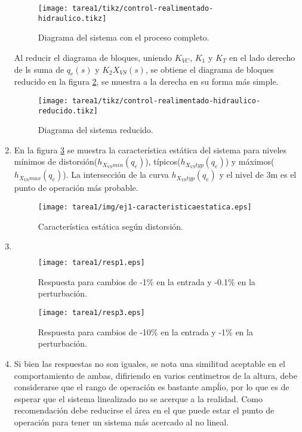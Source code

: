 \begin{ejercicio}
\begin{enumerate}
    \begin{figure}[H]
      \centering
      \texttt{[image: tarea1/tikz/control-realimentado-hidraulico.tikz]}
      \caption{Diagrama del sistema con el proceso completo.}
      \label{ej1:diag1}
    \end{figure}

    Al reducir el diagrama de bloques, uniendo $K_{VC}$, $K_1$ y $K_T$ en el lado derecho de ls suma de $q_e(s)$ y $K_2 X_{VS}(s)$, se obtiene el diagrama de bloques reducido en la figura \ref{ej1:diag2}, se muestra a la derecha en su forma más simple.  

   \begin{figure}[H]
    \centering
      \texttt{[image: tarea1/tikz/control-realimentado-hidraulico-reducido.tikz]}
      \caption{Diagrama del sistema reducido.}
      \label{ej1:diag2}
    \end{figure}

    \item %
    En la figura \ref{ej1:img1} se muestra la característica estática del sistema para niveles mínimos de distorsión($h_{X_{VS}min}(q_e)$), típicos($h_{X_{VS}typ}(q_e)$) y máximos($h_{X_{VS}max}(q_e)$). La intersección de la curva $h_{X_{VS}typ}(q_e)$ y el nivel de 3m es el punto de operación más probable. 
    \begin{figure}[H]
      \centering
      \texttt{[image: tarea1/img/ej1-caracteristicaestatica.eps]}
      \caption{Característica estática según distorsión.}
      \label{ej1:img1}
    \end{figure}

  \newpage
    \item %
    $\quad$
    \begin{figure}[H]
      \centering
      \texttt{[image: tarea1/resp1.eps]}
      \caption{Respuesta para cambios de -1\% en la entrada y -0.1\% en la perturbación.}
      \label{ej1:resp1}
    \end{figure}

    \begin{figure}[H]
      \centering
      \texttt{[image: tarea1/resp3.eps]}
      \caption{Respuesta para cambios de -10\% en la entrada y -1\% en la perturbación.}
      \label{ej1:resp2}
    \end{figure}

    \item %
    Si bien las respuestas no son iguales, se nota una similitud aceptable en el comportamiento de ambas, difiriendo en varios centimetros de la altura, debe considerarse que el rango de operación es bastante ampĺio, por lo que es de esperar que el sistema linealizado no se acerque a la realidad. Como recomendación debe reducirse el área en el que puede estar el punto de operación para tener un sistema más acercado al no lineal.
  \end{enumerate}

\end{ejercicio}
